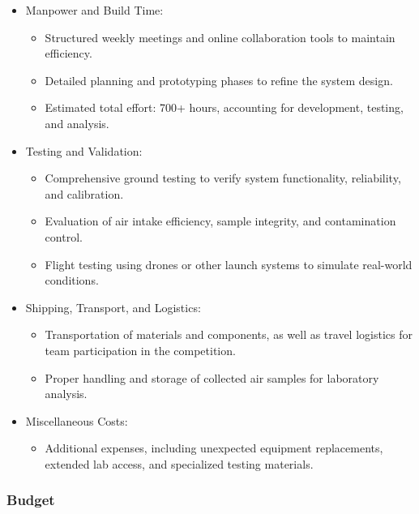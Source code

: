 \begin{itemize}[leftmargin=1cm, itemindent=0.25cm, noitemsep, topsep=0pt, label=$\bullet$]
\item Manpower and Build Time:
\begin{itemize}[label=, noitemsep, topsep=1pt]
\item Structured weekly meetings and online collaboration tools to maintain efficiency.
\item Detailed planning and prototyping phases to refine the system design.
\item Estimated total effort: 700+ hours, accounting for development, testing, and analysis.
\end{itemize}

\item Testing and Validation:
\begin{itemize}[label=, noitemsep, topsep=1pt]
\item Comprehensive ground testing to verify system functionality, reliability, and calibration.
\item Evaluation of air intake efficiency, sample integrity, and contamination control.
\item Flight testing using drones or other launch systems to simulate real-world conditions.
\end{itemize}

\item Shipping, Transport, and Logistics:
\begin{itemize}[label=, noitemsep, topsep=1pt]
\item Transportation of materials and components, as well as travel logistics for team participation in the competition.
\item Proper handling and storage of collected air samples for laboratory analysis.
\end{itemize}

\item Miscellaneous Costs:
\begin{itemize}[label=, noitemsep, topsep=1pt]
\item Additional expenses, including unexpected equipment replacements, extended lab access, and specialized testing materials.
\end{itemize}

\end{itemize}

\subsubsection{Budget}

